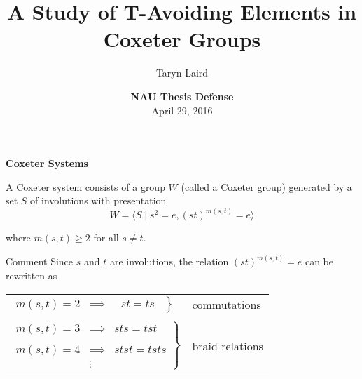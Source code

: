 \documentclass{beamer}
\begin{document}
\def\newblock{\hskip .11em plus .33em minus .07em}

\title[A Study of T-Avoiding Elements in Coxeter Groups]
{\textbf{A Study of T-Avoiding Elements in Coxeter Groups}}
\author[T.M.~Laird]{Taryn Laird}

\vspace{1em}

\date[NAU]{\textbf{NAU Thesis Defense}\\
April 29, 2016}

\frame{\titlepage}




\begin{frame}{\textbf{Coxeter Systems}}

\begin{definition}
A \alert{Coxeter system} consists of a group $W$ (called a \alert{Coxeter group}) generated by a set $S$ of involutions with presentation
\[ W=\langle S \mid s^2=e, (st)^{m(s,t)}=e \rangle \]

where $m(s,t) \geq 2$ for all $s \neq t$.
\end{definition}

\pause

\begin{block}{Comment}
Since $s$ and $t$ are involutions, the relation $(st)^{m(s,t)}=e$ can be 
rewritten as

\begin{center}
\begin{tabular}{ll}
$\left.\begin{array}{lcc}m(s,t)=2 & \implies &\ \ \, st=ts\ \   \end
{array}\right\}$&  \alert{commutations}\\
\\\pause
$\left.\begin{array}{lcc}m(s,t)=3 & \implies & sts=tst \\
& & \\
m(s,t)=4 & \implies & stst=tsts \\
 & \vdots &  \end{array}\right\}$ &\alert{braid relations}
\end{tabular}
\end{center}
\end{block}
\end{frame}
\end{document}
